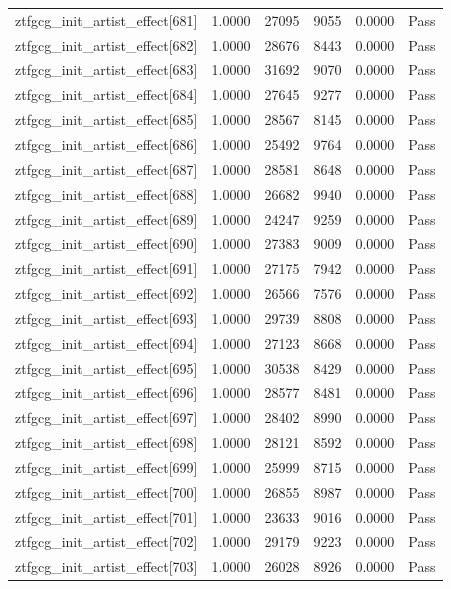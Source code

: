 \begin{table}[htbp]
\begin{tabular}{llrrll}
ztfgcg\_init\_artist\_effect[681] & 1.0000 & 27095 & 9055 & 0.0000 & Pass \\
ztfgcg\_init\_artist\_effect[682] & 1.0000 & 28676 & 8443 & 0.0000 & Pass \\
ztfgcg\_init\_artist\_effect[683] & 1.0000 & 31692 & 9070 & 0.0000 & Pass \\
ztfgcg\_init\_artist\_effect[684] & 1.0000 & 27645 & 9277 & 0.0000 & Pass \\
ztfgcg\_init\_artist\_effect[685] & 1.0000 & 28567 & 8145 & 0.0000 & Pass \\
ztfgcg\_init\_artist\_effect[686] & 1.0000 & 25492 & 9764 & 0.0000 & Pass \\
ztfgcg\_init\_artist\_effect[687] & 1.0000 & 28581 & 8648 & 0.0000 & Pass \\
ztfgcg\_init\_artist\_effect[688] & 1.0000 & 26682 & 9940 & 0.0000 & Pass \\
ztfgcg\_init\_artist\_effect[689] & 1.0000 & 24247 & 9259 & 0.0000 & Pass \\
ztfgcg\_init\_artist\_effect[690] & 1.0000 & 27383 & 9009 & 0.0000 & Pass \\
ztfgcg\_init\_artist\_effect[691] & 1.0000 & 27175 & 7942 & 0.0000 & Pass \\
ztfgcg\_init\_artist\_effect[692] & 1.0000 & 26566 & 7576 & 0.0000 & Pass \\
ztfgcg\_init\_artist\_effect[693] & 1.0000 & 29739 & 8808 & 0.0000 & Pass \\
ztfgcg\_init\_artist\_effect[694] & 1.0000 & 27123 & 8668 & 0.0000 & Pass \\
ztfgcg\_init\_artist\_effect[695] & 1.0000 & 30538 & 8429 & 0.0000 & Pass \\
ztfgcg\_init\_artist\_effect[696] & 1.0000 & 28577 & 8481 & 0.0000 & Pass \\
ztfgcg\_init\_artist\_effect[697] & 1.0000 & 28402 & 8990 & 0.0000 & Pass \\
ztfgcg\_init\_artist\_effect[698] & 1.0000 & 28121 & 8592 & 0.0000 & Pass \\
ztfgcg\_init\_artist\_effect[699] & 1.0000 & 25999 & 8715 & 0.0000 & Pass \\
ztfgcg\_init\_artist\_effect[700] & 1.0000 & 26855 & 8987 & 0.0000 & Pass \\
ztfgcg\_init\_artist\_effect[701] & 1.0000 & 23633 & 9016 & 0.0000 & Pass \\
ztfgcg\_init\_artist\_effect[702] & 1.0000 & 29179 & 9223 & 0.0000 & Pass \\
ztfgcg\_init\_artist\_effect[703] & 1.0000 & 26028 & 8926 & 0.0000 & Pass \\

\end{tabular}
\end{table}
